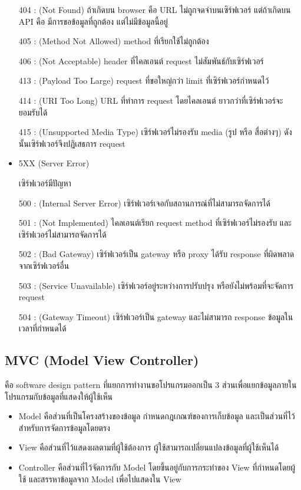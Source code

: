 \begin{itemize}
  404 : (Not Found) ถ้าเกิดบน browser คือ URL ไม่ถูกจดจำบนเซิร์ฟเวอร์ แต่ถ้าเกิดบน API  คือ มีการขอข้อมูลที่ถูกต้อง แต่ไม่มีข้อมูลนี้อยู่

  405 : (Method Not Allowed) method ที่เรียกใช้ไม่ถูกต้อง

  406 : (Not Acceptable) header ที่ไคลเอนต์ request ไม่สัมพันธ์กับเซิร์ฟเวอร์

  413 : (Payload Too Large) request ที่ขอใหญ่กว่า limit ที่เซิร์ฟเวอร์กำหนดไว้

  414 : (URI Too Long) URL ที่ทำการ request โดยไคลเอนต์ ยาวกว่าที่เซิร์ฟเวอร์จะยอมรับได้

  415 : (Unsupported Media Type) เซิร์ฟเวอร์ไม่รองรับ media (รูป หรือ สื่อต่างๆ) ดังนั้นเซิร์ฟเวอร์จึงปฏิเสธการ request

  \item  5XX (Server Error)
  
  เซิร์ฟเวอร์มีปัญหา

  500 : (Internal Server Error) เซิร์ฟเวอร์เจอกับสถานการณ์ที่ไม่สามารถจัดการได้

  501 : (Not Implemented) ไคลเอนต์เรียก request method ที่เซิร์ฟเวอร์ไม่รองรับ และเซิร์ฟเวอร์ไม่สามารถจัดการได้

  502 : (Bad Gateway) เซิร์ฟเวอร์เป็น gateway หรือ proxy ได้รับ response ที่ผิดพลาดจากเซิร์ฟเวอร์อื่น

  503 : (Service Unavailable) เซิร์ฟเวอร์อยู่ระหว่างการปรับปรุง หรือยังไม่พร้อมที่จะจัดการ request

  504 : (Gateway Timeout) เซิร์ฟเวอร์เป็น gateway และไม่สามารถ response ข้อมูลในเวลาที่กำหนดได้

\end{itemize}

\subsection{MVC (Model View Controller)}

คือ software design pattern ที่แยกการทำงานขอโปรแกรมออกเป็น 3 ส่วนเพื่อแยกข้อมูลภายในโปรแกรมกับข้อมูลที่แสดงให้ผู้ใช้เห็น~\cite{mvc}

\begin{itemize}
  \item Model คือส่วนที่เป็นโครงสร้างของข้อมูล กำหนดกฎเกณฑ์ของการเก็บข้อมูล และเป็นส่วนที่ไว้สำหรับการจัดการข้อมูลโดยตรง
  \item View คือส่วนที่ไว้แสดงผลตามที่ผู้ใช้ต้องการ ผู้ใช้สามารถเปลี่ยนแปลงข้อมูลที่ผู้ใช้เห็นได้
  \item Controller คือส่วนที่ไว้จัดการกับ Model โดยขึ้นอยู่กับการกระทำของ View ที่กำหนดโดยผู้ใช้ และสรรหาข้อมูลจาก Model เพื่อไปแสดงใน View
\end{itemize}

